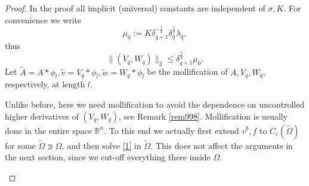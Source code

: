 \documentclass[10pt,a4paper]{amsart}
\newcommand{\R}{\mathbb{R}}
\begin{document}
\begin{proof}
In the proof all implicit (universal) constants are independent of $\sigma,K$. For convenience we write
\begin{equation}\label{mu0}
    \mu_0:=K\delta_{q+1}^{-\frac{1}{2}}\delta_q^\frac{1}{2}\lambda_q,
\end{equation}
thus
\begin{equation}\label{prop1.a2'}
    \|(V_q,W_q)\|_2\le \delta_{q+1}^\frac{1}{2}\mu_0.
\end{equation}
Let $\tilde A=A*\phi_l,\tilde v=V_q*\phi_l,\tilde w=W_q*\phi_l$ be the mollification of $A,V_q,W_q$, respectively, at length $l$. 
\begin{rem}
    Unlike before, here we need mollification to avoid the dependence on uncontrolled higher derivatives of $(V_q,W_q)$, see Remark \ref{rem998}. Mollification is usually done in the entire space $\R^n$. To this end we actually first extend $v^b,f$ to $C_c(\tilde\Omega)$ for some $\tilde\Omega\Supset\Omega$. and then solve \eqref{1} in $\tilde\Omega$. This does not affect the arguments in the next section, since we cut-off everything there inside $\Omega$.


\end{rem}
\end{proof}
\end{document}
